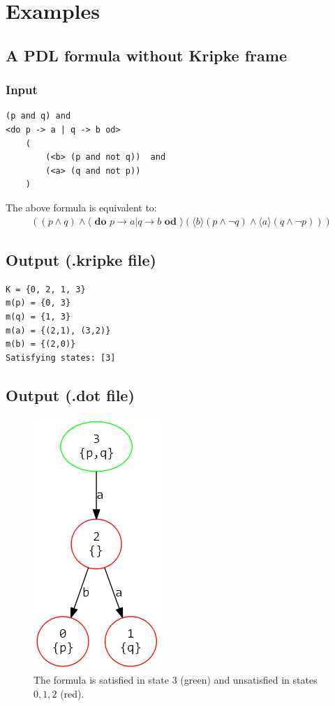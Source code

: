 \documentclass[12pt,a4paper]{article}
\begin{document}
\section{Examples}

\subsection{A PDL formula without Kripke frame}

\subsubsection*{Input}
\begin{verbatim}
(p and q) and
<do p -> a | q -> b od>
    (
        (<b> (p and not q))  and
        (<a> (q and not p))
    )
\end{verbatim}
The above formula is equivalent to:
\begin{align*}
((p \wedge q) \wedge \langle\textbf{ do }p \rightarrow a \vert q \rightarrow b\textbf{ od }\rangle(\langle b\rangle(p \wedge \neg q) \wedge \langle a \rangle(q \wedge \neg p)))
\end{align*}
\subsection*{Output (.kripke file)}
\begin{verbatim}
K = {0, 2, 1, 3}
m(p) = {0, 3}
m(q) = {1, 3}
m(a) = {(2,1), (3,2)}
m(b) = {(2,0)}
Satisfying states: [3]
\end{verbatim}
\subsection*{Output (.dot file)}

\begin{figure}[H]
\center
\includegraphics[scale=0.4]{example1.png}

\caption{The formula is satisfied in state $3$ (green) and unsatisfied in states $0, 1, 2$ (red). }
\end{figure}
\end{document}
